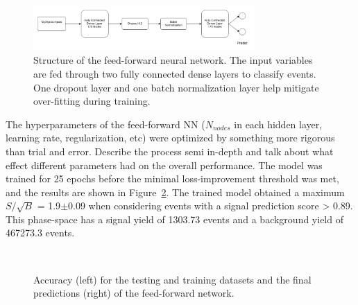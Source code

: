 \begin{figure}[!h] 
\begin{center}
\includegraphics*[width=0.75\textwidth] {ffNN/figures/flowchart_ffNN.png}
\caption{Structure of the feed-forward neural network. The input variables are fed through two fully connected dense layers to classify events. One dropout layer and one batch normalization layer help mitigate over-fitting during training.}
  \label{fig:nn}
\end{center}
\end{figure}

The hyperparameters of the feed-forward NN ($N_{nodes}$ in each hidden layer, learning rate, regularization, etc) were optimized by something more rigorous than trial and error. Describe the process semi in-depth and talk about what effect different parameters had on the overall performance. The model was trained for 25 epochs before the minimal loss-improvement threshold was met, and the results are shown in Figure~\ref{fig:results_nn}. The trained model obtained a maximum $S/\sqrt{B}$ = 1.9$\pm$0.09 when considering events with a signal prediction score > 0.89. This phase-space has a signal yield of 1303.73 events and a background yield of 467273.3 events.

\begin{figure}[!h] 
\begin{center}
  \\
\caption{Accuracy (left) for the testing and training datasets and the final predictions (right) of the feed-forward network.}
  \label{fig:results_nn}
\end{center}
\end{figure}

